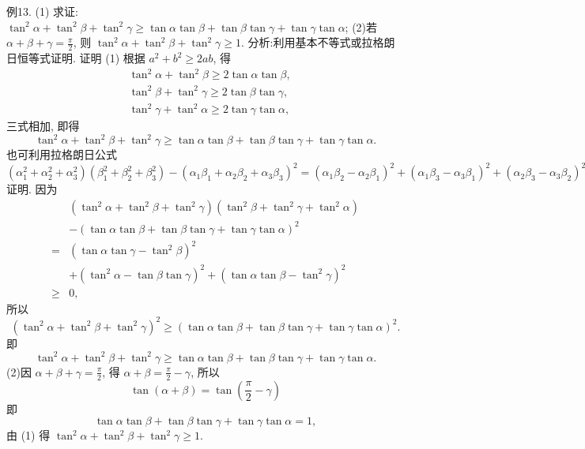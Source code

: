 例13. (1) 求证: $\tan ^2 \alpha+\tan ^2 \beta+\tan ^2 \gamma \geqslant \tan \alpha \tan \beta+\tan \beta \tan \gamma+\tan \gamma \tan \alpha$;
 (2)若 $\alpha+\beta+\gamma=\frac{\pi}{2}$, 则 $\tan ^2 \alpha+\tan ^2 \beta+\tan ^2 \gamma \geqslant 1$.
分析:利用基本不等式或拉格朗日恒等式证明.
证明 (1) 根据 $a^2+b^2 \geqslant 2 a b$, 得
$$
\begin{aligned}
& \tan ^2 \alpha+\tan ^2 \beta \geqslant 2 \tan \alpha \tan \beta, \\
& \tan ^2 \beta+\tan ^2 \gamma \geqslant 2 \tan \beta \tan \gamma, \\
& \tan ^2 \gamma+\tan ^2 \alpha \geqslant 2 \tan \gamma \tan \alpha,
\end{aligned}
$$
三式相加, 即得
$$
\tan ^2 \alpha+\tan ^2 \beta+\tan ^2 \gamma \geqslant \tan \alpha \tan \beta+\tan \beta \tan \gamma+\tan \gamma \tan \alpha .
$$
也可利用拉格朗日公式 $\left(\alpha_1^2+\alpha_2^2+\alpha_3^2\right)\left(\beta_1^2+\beta_2^2+\beta_3^2\right)-\left(\alpha_1 \beta_1+\alpha_2 \beta_2+\right. \left.\alpha_3 \beta_3\right)^2=\left(\alpha_1 \beta_2-\alpha_2 \beta_1\right)^2+\left(\alpha_1 \beta_3-\alpha_3 \beta_1\right)^2+\left(\alpha_2 \beta_3-\alpha_3 \beta_2\right)^2$ 证明.
因为
$$
\begin{aligned}
& \left(\tan ^2 \alpha+\tan ^2 \beta+\tan ^2 \gamma\right)\left(\tan ^2 \beta+\tan ^2 \gamma+\tan ^2 \alpha\right) \\
& -(\tan \alpha \tan \beta+\tan \beta \tan \gamma+\tan \gamma \tan \alpha)^2 \\
= & \left(\tan \alpha \tan \gamma-\tan ^2 \beta\right)^2 \\
& +\left(\tan ^2 \alpha-\tan \beta \tan \gamma\right)^2+\left(\tan \alpha \tan \beta-\tan ^2 \gamma\right)^2 \\
\geqslant & 0,
\end{aligned}
$$
所以
$$
\left(\tan ^2 \alpha+\tan ^2 \beta+\tan ^2 \gamma\right)^2 \geqslant(\tan \alpha \tan \beta+\tan \beta \tan \gamma+\tan \gamma \tan \alpha)^2 .
$$
即
$$
\tan ^2 \alpha+\tan ^2 \beta+\tan ^2 \gamma \geqslant \tan \alpha \tan \beta+\tan \beta \tan \gamma+\tan \gamma \tan \alpha .
$$
 (2)因 $\alpha+\beta+\gamma=\frac{\pi}{2}$, 得 $\alpha+\beta=\frac{\pi}{2}-\gamma$, 所以
$$
\tan (\alpha+\beta)=\tan \left(\frac{\pi}{2}-\gamma\right)
$$
即
$$
\tan \alpha \tan \beta+\tan \beta \tan \gamma+\tan \gamma \tan \alpha=1,
$$
由 (1) 得 $\tan ^2 \alpha+\tan ^2 \beta+\tan ^2 \gamma \geqslant 1$.



